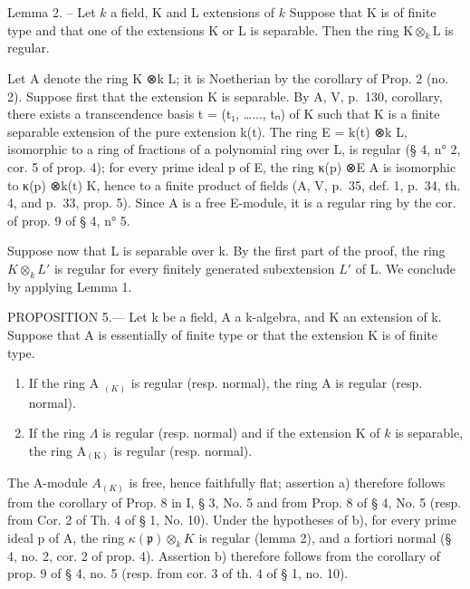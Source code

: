 Lemma 2. -- Let \(k\) a field, K and L extensions of \(k\) Suppose that K is of finite type and that one of the extensions K or L is separable. Then the ring \(\mathrm{K} \otimes_{k} \mathrm{L}\) is regular.

Let A denote the ring K ⊗k L; it is Noetherian by the corollary of Prop. 2 (no. 2). Suppose first that the extension K is separable. By A, V, p.~130, corollary, there exists a transcendence basis t = (t₁, \ldots..., tₙ) of K such that K is a finite separable extension of the pure extension k(t). The ring E = k(t) ⊗k L, isomorphic to a ring of fractions of a polynomial ring over L, is regular (§ 4, n° 2, cor. 5 of prop. 4); for every prime ideal p of E, the ring κ(p) ⊗E A is isomorphic to κ(p) ⊗k(t) K, hence to a finite product of fields (A, V, p.~35, def. 1, p.~34, th. 4, and p.~33, prop. 5). Since A is a free E-module, it is a regular ring by the cor. of prop. 9 of § 4, n° 5.

Suppose now that L is separable over k. By the first part of the proof, the ring \(K \otimes_{k} L'\) is regular for every finitely generated subextension \(L'\) of L. We conclude by applying Lemma 1.

PROPOSITION 5.--- Let k be a field, A a k-algebra, and K an extension of k. Suppose that A is essentially of finite type or that the extension K is of finite type.

\begin{enumerate}
\def\labelenumi{\alph{enumi})}
\item
  If the ring A \(_{(K)}\) is regular (resp. normal), the ring A is regular (resp. normal).
\item
  If the ring \(\Lambda\) is regular (resp. normal) and if the extension K of \(k\) is separable, the ring \(\mathrm{A}_{(\mathrm{K})}\) is regular (resp. normal).
\end{enumerate}

The A-module \(A_{(K)}\) is free, hence faithfully flat; assertion a) therefore follows from the corollary of Prop. 8 in I, § 3, No. 5 and from Prop. 8 of § 4, No. 5 (resp. from Cor. 2 of Th. 4 of § 1, No. 10). Under the hypotheses of b), for every prime ideal p of A, the ring \(\kappa(\mathfrak{p})\otimes_{k}K\) is regular (lemma 2), and a fortiori normal (§ 4, no. 2, cor. 2 of prop. 4). Assertion b) therefore follows from the corollary of prop. 9 of § 4, no. 5 (resp. from cor. 3 of th. 4 of § 1, no. 10).
